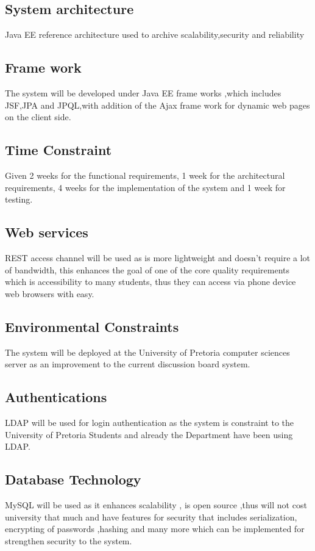 \begin{flushleft}
			
\subsection*{System architecture} 
Java EE reference architecture used to archive scalability,security and reliability 

\subsection*{Frame work}
The system will be developed under Java EE frame works ,which includes JSF,JPA and JPQL,with addition of the Ajax frame work for dynamic web pages on the client side.

\subsection*{Time Constraint} 
Given 2 weeks for the functional requirements, 1 week for the architectural requirements, 4 weeks for the implementation of the system and 1 week for testing.

\subsection*{Web services}
REST access channel will be used as is more lightweight and doesn't require a lot of bandwidth, this enhances the goal of one of the core quality requirements which is accessibility to many students, thus they can access via phone device web browsers with easy.

\subsection*{Environmental Constraints}
The system will be deployed at the University of Pretoria computer sciences server as an improvement to the current discussion board system.

\subsection*{Authentications}
LDAP will be used for login authentication as the system is constraint to the University of Pretoria Students and already the Department have been using LDAP.

\subsection*{Database Technology}
MySQL will be used as it enhances scalability , is open source ,thus will not cost university that much and have features for security that includes serialization, encrypting of passwords ,hashing and many more which can be implemented for strengthen security to the system.
		
\end{flushleft}
